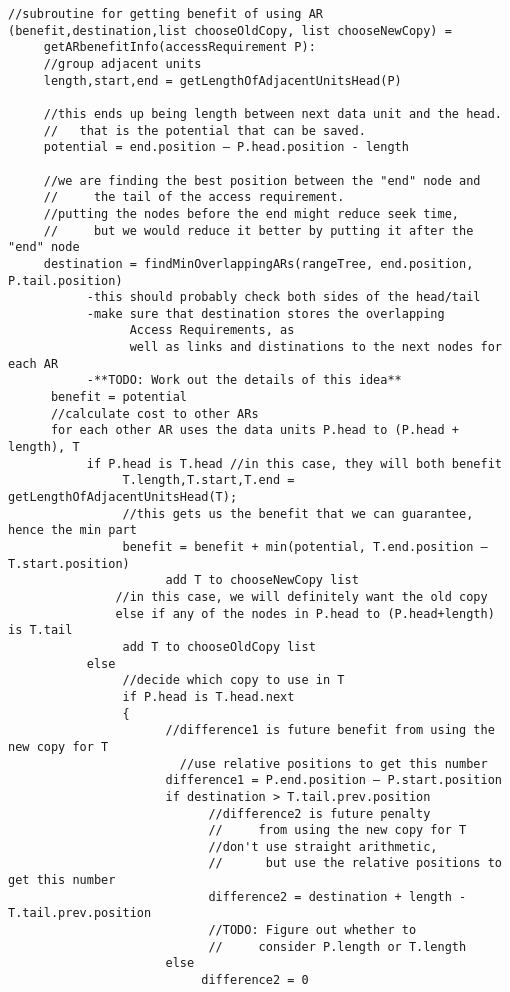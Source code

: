 \documentclass[11pt,psfig]{article}
\begin{document}
\begin{verbatim}
//subroutine for getting benefit of using AR
(benefit,destination,list chooseOldCopy, list chooseNewCopy) = 
     getARbenefitInfo(accessRequirement P):
     //group adjacent units
     length,start,end = getLengthOfAdjacentUnitsHead(P)
	
     //this ends up being length between next data unit and the head. 
     //   that is the potential that can be saved.
     potential = end.position – P.head.position - length

     //we are finding the best position between the "end" node and 
     //     the tail of the access requirement.
     //putting the nodes before the end might reduce seek time, 
     //     but we would reduce it better by putting it after the "end" node
     destination = findMinOverlappingARs(rangeTree, end.position, P.tail.position)
           -this should probably check both sides of the head/tail
           -make sure that destination stores the overlapping 
                 Access Requirements, as
                 well as links and distinations to the next nodes for each AR
           -**TODO: Work out the details of this idea**
      benefit = potential
      //calculate cost to other ARs
      for each other AR uses the data units P.head to (P.head + length), T
           if P.head is T.head //in this case, they will both benefit
                T.length,T.start,T.end = getLengthOfAdjacentUnitsHead(T);
                //this gets us the benefit that we can guarantee, hence the min part
                benefit = benefit + min(potential, T.end.position – T.start.position)
			          add T to chooseNewCopy list
		       //in this case, we will definitely want the old copy
		       else if any of the nodes in P.head to (P.head+length) is T.tail
                add T to chooseOldCopy list
           else
                //decide which copy to use in T
                if P.head is T.head.next
                {
                      //difference1 is future benefit from using the new copy for T
	                    //use relative positions to get this number
                      difference1 = P.end.position – P.start.position
                      if destination > T.tail.prev.position
                            //difference2 is future penalty 
                            //     from using the new copy for T
                            //don't use straight arithmetic, 
                            //      but use the relative positions to get this number
                            difference2 = destination + length - T.tail.prev.position
                            //TODO: Figure out whether to 
                            //     consider P.length or T.length
                      else
                           difference2 = 0
				

\end{verbatim}
\end{document}
